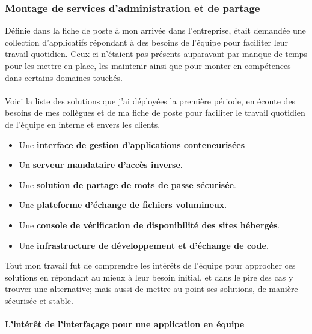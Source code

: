 \begin{sloppypar}
\subsubsection{Montage de services d'administration et de partage}

Définie dans la fiche de poste à mon arrivée dans l'entreprise, était demandée une collection d'applicatifs répondant à des besoins de l'équipe pour faciliter leur travail quotidien. Ceux-ci n'étaient pas présents auparavant par manque de temps pour les mettre en place, les maintenir ainsi que pour monter en compétences dans certains domaines touchés.
\\ \\
Voici la liste des solutions que j'ai déployées la première période, en écoute des besoins de mes collègues et de ma fiche de poste pour faciliter le travail quotidien de l'équipe en interne et envers les clients.

\begin{itemize}
  \item Une \textbf{interface de gestion d'applications conteneurisées}
  \item Un \textbf{serveur mandataire d'accès inverse}.
  \item Une \textbf{solution de partage de mots de passe sécurisée}.
  \item Une \textbf{plateforme d'échange de fichiers volumineux}.
  \item Une \textbf{console de vérification de disponibilité des sites hébergés}.
  \item Une \textbf{infrastructure de développement et d'échange de code}.
\end{itemize}

\noindent Tout mon travail fut de comprendre les intérêts de l'équipe pour approcher ces solutions en répondant au mieux à leur besoin initial, et dans le pire des cas y trouver une alternative; mais aussi de mettre au point ses solutions, de manière sécurisée et stable.

\paragraph{L'intérêt de l'interfaçage pour une application en équipe}


\end{sloppypar}
